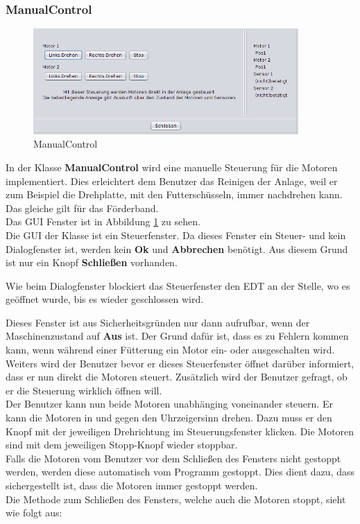 \subsubsection{ManualControl}
  \begin{figure}[H]
    \includegraphics[width=0.90\textwidth]{Bilder/GUI/ManualControl}
    \caption{ManualControl}
  \label{ManualControl}
  \end{figure}
In der Klasse \textbf{ManualControl} wird eine manuelle Steuerung für die Motoren implementiert. Dies erleichtert dem Benutzer das Reinigen der Anlage, weil er zum Beispiel die Drehplatte, mit den Futterschüsseln, immer nachdrehen kann. Das gleiche gilt für das Förderband.
\\ Das \ac{GUI} Fenster ist in Abbildung \ref{ManualControl} zu sehen.
\\ Die \ac{GUI} der Klasse ist ein Steuerfenster. Da dieses Fenster ein Steuer- und kein Dialogfenster ist, werden kein \textbf{Ok} und \textbf{Abbrechen} benötigt. Aus diesem Grund ist nur ein Knopf \textbf{Schließen} vorhanden.

\vspace{10pt}

Wie beim Dialogfenster blockiert das Steuerfenster den \ac{EDT} an der Stelle, wo es geöffnet wurde, bis es wieder geschlossen wird.

\vspace{10pt}

Dieses Fenster ist aus Sicherheitsgründen nur dann aufrufbar, wenn der Maschinenzustand auf \textbf{Aus} ist. Der Grund dafür ist, dass es zu Fehlern kommen kann, wenn während einer Fütterung ein Motor ein- oder ausgeschalten wird.
\\ Weiters wird der Benutzer bevor er dieses Steuerfenster öffnet darüber informiert, dass er nun direkt die Motoren steuert. Zusätzlich wird der Benutzer gefragt, ob er die Steuerung wirklich öffnen will.
\\ Der Benutzer kann nun beide Motoren unabhänging voneinander steuern. Er kann die Motoren in und gegen den Uhrzeigersinn drehen. Dazu muss er den Knopf mit der jeweiligen Drehrichtung im Steuerungsfenster klicken. Die Motoren sind mit dem jeweiligen Stopp-Knopf wieder stoppbar.
\\ Falls die Motoren vom Benutzer vor dem Schließen des Fensters nicht gestoppt werden, werden diese automatisch vom Programm gestoppt. Dies dient dazu, dass sichergestellt ist, dass die Motoren immer gestoppt werden.
\\ Die Methode zum Schließen des Fensters, welche auch die Motoren stoppt, sieht wie folgt aus:

